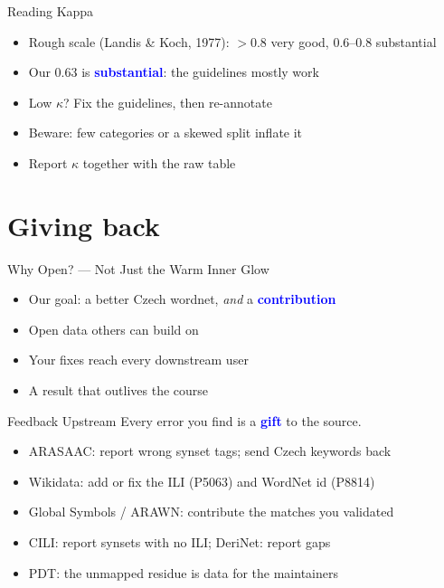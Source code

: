 \documentclass[xetex,aspectratio=169]{beamer}
\newcommand{\txx}[1]{\textbf{\textcolor{blue}{#1}}}
\begin{document}
\begin{frame}{Reading Kappa}
  \begin{itemize}
  \item Rough scale (Landis \& Koch, 1977): $>0.8$ very good, $0.6$--$0.8$ substantial
  \item Our 0.63 is \txx{substantial}: the guidelines mostly work
  \item Low $\kappa$? Fix the guidelines, then re-annotate
  \item Beware: few categories or a skewed split inflate it
  \item Report $\kappa$ together with the raw table
  \end{itemize}
\end{frame}

\section{Giving back}

\begin{frame}{Why Open? --- Not Just the Warm Inner Glow}
  \begin{itemize}
  \item Our goal: a better Czech wordnet, \emph{and} a \txx{contribution}
  \item Open data others can build on
  \item Your fixes reach every downstream user
  \item A result that outlives the course
  \end{itemize}
\end{frame}

\begin{frame}{Feedback Upstream}
  Every error you find is a \txx{gift} to the source.
  \begin{itemize}
  \item ARASAAC: report wrong synset tags; send Czech keywords back
  \item Wikidata: add or fix the ILI (P5063) and WordNet id (P8814)
  \item Global Symbols / ARAWN: contribute the matches you validated
  \item CILI: report synsets with no ILI; DeriNet: report gaps
  \item PDT: the unmapped residue is data for the maintainers
  \end{itemize}
\end{frame}
\end{document}

